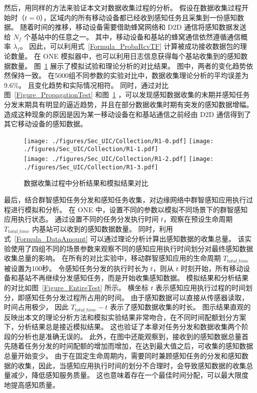 然后，用同样的方法来验证本文对数据收集过程的分析。
假设在数据收集过程开始时（$t=0$），区域内的所有移动设备都已经收到感知任务且采集到一份感知数据。
随着时间的推移，移动设备需要借助蜂窝网络和 D2D 通信将感知数据发送给 $N_f$ 个基站中的任意之一。
其中，移动设备和基站的蜂窝通信依然遵循通信概率 $\lambda_f$。
因此，可以利用式~\eqref{Formula_ProbaRcvTF} 计算被成功接收数据包的理论数量。
在 ONE 模拟器中，也可以利用日志信息获得每个基站收集到的感知数据数量。
图~\ref{Figure_CollectionTest} 展示了模拟试验和理论分析的对比结果。
图中，两者的变化趋势依然保持一致。
在5000组不同参数的实验对比中，数据收集理论分析的平均误差为 9.6\%。
且变化趋势和实际情况相符。
同时，通过对比图~\ref{Figure_PropagationTest} 和图~\ref{Figure_CollectionTest} ，可以发现感知数据收集的末期并感知任务分发末期具有明显的逼近趋势，并且在部分数据收集时期有突发的感知数据增幅。
造成这种现象的原因是因为某一移动设备在和基站通信之前经由 D2D 通信得到了其它移动设备的感知数据。

\begin{figure}[!h]
  \centering
  {\texttt{[image: ./figures/Sec\_UIC/Collection/R1-0.pdf]}}
  {\texttt{[image: ./figures/Sec\_UIC/Collection/R1-1.pdf]}}\\
  {\texttt{[image: ./figures/Sec\_UIC/Collection/R1-2.pdf]}}
  {\texttt{[image: ./figures/Sec\_UIC/Collection/R1-3.pdf]}}
  \vspace{-0.5em}
  \caption{数据收集过程中分析结果和模拟结果对比}
  \vspace{-0.5em}
  \label{Figure_CollectionTest}
\end{figure}

最后，结合群智感知任务分发和感知任务收集，对边缘网络中群智感知应用执行过程进行模拟和分析。
在 ONE 中，设置不同的参数以模拟不同场景下的群智感知应用执行状态。
通过设置不同的任务分发执行时间 $t$，观察在预设生命周期 $T_{total\_time}$ 内基站可以收到的感知数据数量。
同时，利用式~\ref{Formula_DataAmount} 可以通过理论分析计算出感知数据的收集总量。
该实验使用了四组不同的场景参数来观察不同的感知应用执行时间划分对最终感知数据收集总量的影响。
在所有的对比实验中，移动群智感知应用的生命周期 $T_{total\_time}$ 被设置为100秒。
令感知任务分发的执行时长为 $t$，则从 $t$ 时刻开始，所有移动设备和基站不再继续分发感知任务，而是开始收集感知数据。
模拟结果和分析结果的对比如图~\ref{Figure_EntireTest} 所示。
横坐标 $t$ 表示感知应用执行过程的时间划分，即感知任务分发过程所占用的时间。
由于感知数据可以直接从传感器读取，时间占用极少，
因此 $T_{total\_time} - t$  表示了感知数据收集的时长。
图示结果直观的反映出本文的理论分析方法和模拟实验结果非常吻合，在不同时间配额划分方案下，分析结果总是接近模拟结果。
这也验证了本章对任务分发和数据收集两个阶段的分析也是准确无误的。
此外，在图中还能观察到，接收到的感知数据总量首先随着任务分发的时间配额的增加而增加，在达到最大值之后，可收集的感知数据总量开始变少。
由于在固定生命周期内，需要同时兼顾感知任务的分发和感知数据的收集，因此，当感知应用执行时间的划分不合理时，会导致感知数据的收集总量减少，降低感知服务质量。
这也意味着存在一个最佳时间分配，可以最大限度地提高感知质量。

